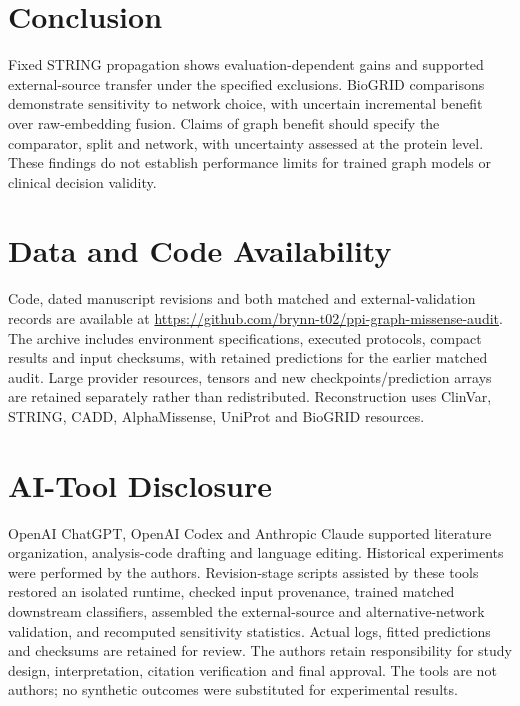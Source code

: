 \documentclass[conference]{IEEEtran}
\begin{document}
\section{Conclusion}
Fixed STRING propagation shows evaluation-dependent gains and supported external-source transfer under the specified exclusions. BioGRID comparisons demonstrate sensitivity to network choice, with uncertain incremental benefit over raw-embedding fusion. Claims of graph benefit should specify the comparator, split and network, with uncertainty assessed at the protein level. These findings do not establish performance limits for trained graph models or clinical decision validity.

\section*{Data and Code Availability}

Code, dated manuscript revisions and both matched and external-validation records are available at \url{https://github.com/brynn-t02/ppi-graph-missense-audit}. The archive includes environment specifications, executed protocols, compact results and input checksums, with retained predictions for the earlier matched audit. Large provider resources, tensors and new checkpoints/prediction arrays are retained separately rather than redistributed. Reconstruction uses ClinVar, STRING, CADD, AlphaMissense, UniProt and BioGRID resources.

\section*{AI-Tool Disclosure}

OpenAI ChatGPT, OpenAI Codex and Anthropic Claude supported literature organization, analysis-code drafting and language editing. Historical experiments were performed by the authors. Revision-stage scripts assisted by these tools restored an isolated runtime, checked input provenance, trained matched downstream classifiers, assembled the external-source and alternative-network validation, and recomputed sensitivity statistics. Actual logs, fitted predictions and checksums are retained for review. The authors retain responsibility for study design, interpretation, citation verification and final approval. The tools are not authors; no synthetic outcomes were substituted for experimental results.
\end{document}
